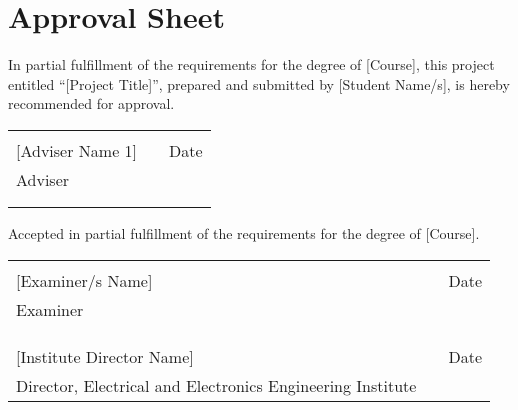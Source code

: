 \chapter*{Approval Sheet}
\thispagestyle{empty}
In partial fulfillment of the requirements for the degree of [Course], this project
entitled ``[Project Title]'', prepared and submitted by [Student Name/s], is hereby recommended for approval.

\vspace*{1cm}

\begin{tabular}{llc}
 &  & \tabularnewline
\cline{1-1} \cline{3-3} 
[Adviser Name 1] &  & Date\tabularnewline
Adviser &  & \tabularnewline
 &  & \tabularnewline
 
 
 
\hspace*{10cm} & \hspace*{1cm} & \hspace*{2cm}\tabularnewline
\end{tabular}

\vspace*{1cm}

\noindent Accepted in partial fulfillment of the requirements for
the degree of [Course].

\vspace*{1cm}
\begin{tabular}{llc}
 &  & \tabularnewline
\cline{1-1} \cline{3-3} 
[Examiner/s Name] &  & Date\tabularnewline
Examiner &  & \tabularnewline
 &  & \tabularnewline
\hspace*{10cm} & \hspace*{1cm} & \hspace*{2cm}\tabularnewline
 &  & \tabularnewline
\cline{1-1} \cline{3-3} 
[Institute Director Name] &  & Date\tabularnewline
Director, Electrical and Electronics Engineering Institute &  & \tabularnewline
\end{tabular}
